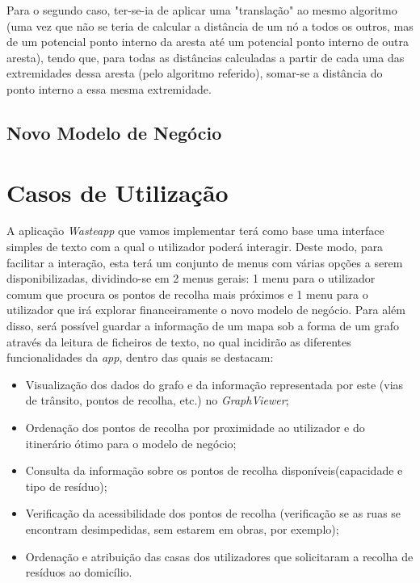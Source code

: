 \documentclass[article, a4paper, 12pt, oneside]{memoir}
\begin{document}
Para o segundo caso, ter-se-ia de aplicar uma "translação" ao mesmo algoritmo (uma vez que não se teria de calcular a distância de um nó a todos os outros, mas de um potencial ponto interno da aresta até um potencial ponto interno de outra aresta), tendo que, para todas as distâncias calculadas a partir de cada uma das extremidades dessa aresta (pelo algoritmo referido), somar-se a distância do ponto interno a essa mesma extremidade.\\

\section{Novo Modelo de Negócio}




\newpage
\chapter[Casos de Utilização][Casos de Utilização]{Casos de Utilização} \label{\thechapter}

A aplicação \textit{Wasteapp} que vamos implementar terá como base uma interface simples de texto com a qual o utilizador poderá interagir. Deste modo, para facilitar a interação, esta terá um conjunto de menus com várias opções a serem disponibilizadas, dividindo-se em 2 menus gerais: 1 menu para o utilizador comum que procura os pontos de recolha mais próximos e 1 menu para o utilizador que irá explorar financeiramente o novo modelo de negócio.
Para além disso, será possível guardar a informação de um mapa sob a forma de um grafo através da leitura de ficheiros de texto, no qual incidirão as diferentes funcionalidades da \textit{app}, dentro das quais se destacam:

\begin{itemize}
\item Visualização dos dados do grafo e da informação representada por este (vias de trânsito, pontos de recolha, etc.) no \textit{GraphViewer};
\item Ordenação dos pontos de recolha por proximidade ao utilizador e do itinerário ótimo para o modelo de negócio;
\item Consulta da informação sobre os pontos de recolha disponíveis(capacidade e tipo de resíduo);
\item Verificação da acessibilidade dos pontos de recolha (verificação se as ruas se encontram desimpedidas, sem estarem em obras, por exemplo);
\item Ordenação e atribuição das casas dos utilizadores que solicitaram a recolha de resíduos ao domicílio.

\end{itemize}
\end{document}
